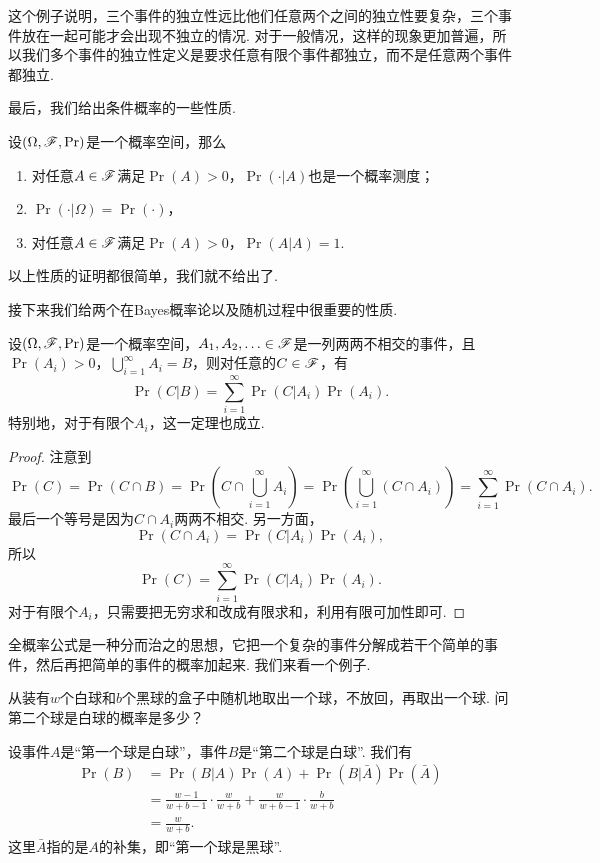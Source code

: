 这个例子说明，三个事件的独立性远比他们任意两个之间的独立性要复杂，三个事件放在一起可能才会出现不独立的情况. 对于一般情况，这样的现象更加普遍，所以我们多个事件的独立性定义是要求任意有限个事件都独立，而不是任意两个事件都独立. 

最后，我们给出条件概率的一些性质. 

\begin{proposition}\label{prop:conditional-probability}
设$(\Omega,\mathscr{F},\Pr)$是一个概率空间，那么
\begin{enumerate}
    \item 对任意$A\in\mathscr{F}$满足$\Pr(A)>0$，$\Pr(\cdot|A)$也是一个概率测度；
    \item $\Pr(\cdot|\Omega)=\Pr(\cdot)$，
    \item 对任意$A\in\mathscr{F}$满足$\Pr(A)>0$，$\Pr(A|A)=1$.
\end{enumerate}
\end{proposition}
以上性质的证明都很简单，我们就不给出了. 

接下来我们给两个在Bayes概率论以及随机过程中很重要的性质. 

\begin{theorem}[全概率公式]\label{thm:total-probability}
设$(\Omega,\mathscr{F},\Pr)$是一个概率空间，$A_1,A_2,\ldots\in\mathscr{F}$是一列两两不相交的事件，且$\Pr(A_i)>0$，$\bigcup_{i=1}^\infty A_i=B$，则对任意的$C\in\mathscr{F}$，有
\[
    \Pr(C|B) = \sum_{i=1}^\infty \Pr(C|A_i)\Pr(A_i).
\]
特别地，对于有限个$A_i$，这一定理也成立. 
\end{theorem}
\begin{proof}
注意到
\[
    \Pr(C) = \Pr(C\cap B) = \Pr\left(C\cap\bigcup_{i=1}^\infty A_i\right) = \Pr\left(\bigcup_{i=1}^\infty (C\cap A_i)\right) = \sum_{i=1}^\infty \Pr(C\cap A_i).
\]
最后一个等号是因为$C\cap A_i$两两不相交. 另一方面，
\[
    \Pr(C\cap A_i) = \Pr(C|A_i)\Pr(A_i),
\]
所以
\[
    \Pr(C) = \sum_{i=1}^\infty \Pr(C|A_i)\Pr(A_i).
\]
对于有限个$A_i$，只需要把无穷求和改成有限求和，利用有限可加性即可. 
\end{proof}

全概率公式是一种分而治之的思想，它把一个复杂的事件分解成若干个简单的事件，然后再把简单的事件的概率加起来. 我们来看一个例子. 

\begin{example}
    从装有$w$个白球和$b$个黑球的盒子中随机地取出一个球，不放回，再取出一个球. 问第二个球是白球的概率是多少？

    设事件$A$是“第一个球是白球”，事件$B$是“第二个球是白球”. 我们有
\begin{align*}
    \Pr(B) &= \Pr(B|A)\Pr(A) + \Pr(B|\bar{A})\Pr(\bar{A}) \\
    &=\frac{w-1}{w+b-1}\cdot\frac{w}{w+b} + \frac{w}{w+b-1}\cdot\frac{b}{w+b}\\
    &=\frac{w}{w+b}.
\end{align*}
    这里$\bar A$指的是$A$的补集，即“第一个球是黑球”. 
\end{example}

